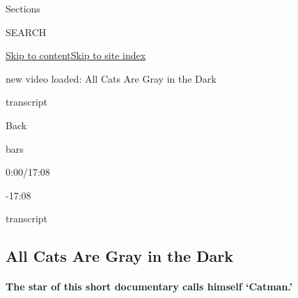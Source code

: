 Sections

SEARCH

\protect\hyperlink{site-content}{Skip to
content}\protect\hyperlink{site-index}{Skip to site index}

new video loaded: All Cats Are Gray in the Dark

transcript

Back

bars

0:00/17:08

-17:08

transcript

\hypertarget{all-cats-are-gray-in-the-dark}{%
\subsection{All Cats Are Gray in the
Dark}\label{all-cats-are-gray-in-the-dark}}

\hypertarget{the-star-of-this-short-documentary-calls-himself-catman}{%
\paragraph{The star of this short documentary calls himself
`Catman.'}\label{the-star-of-this-short-documentary-calls-himself-catman}}

